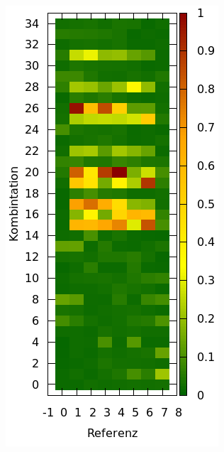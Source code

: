 \begin{figure} [h]
         \centering
         \caption{Analyse der Konditionszahlen gegen die Berechnungsergebnisse eines Messpunktes; Auffällig ist, dass die Lösungen für Referenzantenne 0 und 7 praktisch \textbf{keine} korrekte Lösung liefern. }
         \label{fig:CondNumberAnalyze}
%         
         \begin{subfigure}[t]{0.4\textwidth}
                 \centering
                 \includegraphics[width=\textwidth]{common/img/ConditionPlot_scaled.png}

\end{subfigure}
\end{figure}
